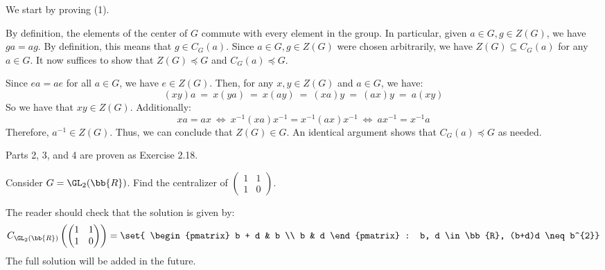 \documentclass{article}
\begin{document}
\begin{pf}[source=Primary Source Material]
We start by proving (1). \npgh

By definition, the elements of the center of $ G $ commute with every element in the group. In particular, given $ a \in G, g \in Z(G) $, we have $ ga = ag $. By definition, this means that $ g \in C_G(a) $.
Since $ a \in G, g \in Z(G) $ were chosen arbitrarily, we have $ Z(G) \subseteq C_{G}(a) $ for any $ a \in G $. It now suffices to show that $ Z(G) \preceq G $ and $ C_{G}(a) \preceq G $. \npgh

Since $ ea = ae $ for all $ a \in G $, we have $ e \in Z(G) $. Then, for any $ x, y \in Z(G) $ and $ a \in G $, we have:
\begin{equation*}
    (xy)a \ = \ x(ya) \ = \ x(ay) \ = \ (xa)y \ = \ (ax)y \ = \ a(xy)
\end{equation*}
So we have that $ xy \in Z(G) $. Additionally:
\begin{equation*}
    xa = ax \ \iff \ x^{-1}(xa)x^{-1} = x^{-1} (ax)x^{-1} \ \iff \ ax^{-1} = x^{-1} a
\end{equation*}
Therefore, $ a^{-1} \in Z(G) $. Thus, we can conclude that $ Z(G) \in G $. An identical argument shows that $ C_{G}(a) \preceq G $ as needed. \npgh

Parts 2, 3, and 4 are proven as Exercise 2.18.
\end{pf}

\begin{prb}[source=Primary Source Material]
Consider $ G = \GL_{2}(\bb{R}) $. Find the centralizer of $ 
\begin{pmatrix}
    1 & 1 \\ 1 & 0
\end{pmatrix}
$.
\end{prb}

\begin{soln}[source=Primary Source Material]
The reader should check that the solution is given by:
\begin{equation*}
C_{\GL_{2}(\bb{R})}\left( 
\begin{pmatrix}
    1 & 1 \\ 1 & 0
\end{pmatrix}\right) = \set{
\begin{pmatrix}
    b + d & b \\ b & d
\end{pmatrix} : b, d \in \bb{R}, (b+d)d \neq b^{2}}
\end{equation*}
The full solution will be added in the future.
\end{soln}
\end{document}
